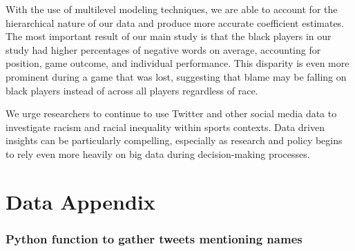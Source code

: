 \documentclass[12pt,twoside]{reedthesis}
\begin{document}
With the use of multilevel modeling techniques, we are able to account
for the hierarchical nature of our data and produce more accurate
coefficient estimates. The most important result of our main study is
that the black players in our study had higher percentages of negative
words on average, accounting for position, game outcome, and individual
performance. This disparity is even more prominent during a game that
was lost, suggesting that blame may be falling on black players instead
of across all players regardless of race.

We urge researchers to continue to use Twitter and other social media
data to investigate racism and racial inequality within sports contexts.
Data driven insights can be particularly compelling, especially as
research and policy begins to rely even more heavily on big data during
decision-making processes.

\appendix

\chapter{Data Appendix}\label{data-appendix}

\subsection{Python function to gather tweets mentioning
names}\label{python-function-to-gather-tweets-mentioning-names}
\end{document}

